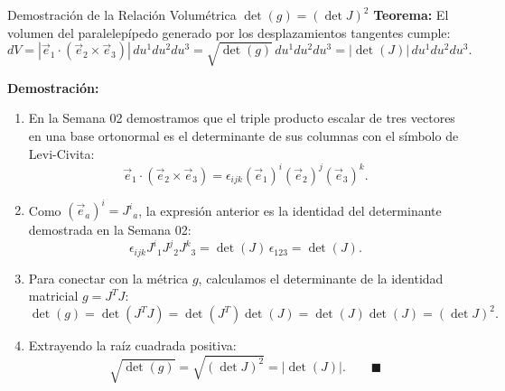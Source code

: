 \documentclass[10pt,aspectratio=169]{beamer}
\begin{document}
\begin{frame}{Demostración de la Relación Volumétrica $\det(g) = (\det J)^2$}
  \footnotesize
  \textbf{Teorema:} El volumen del paralelepípedo generado por los desplazamientos tangentes cumple:
  \[
  dV = |\vec{e}_1 \cdot (\vec{e}_2 \times \vec{e}_3)|\, du^1 du^2 du^3 = \sqrt{\det(g)}\, du^1 du^2 du^3 = |\det(J)|\, du^1 du^2 du^3.
  \]

  \vspace{0.2cm}
  \textbf{Demostración:}
  \begin{enumerate}\itemsep4pt
    \item En la Semana 02 demostramos que el triple producto escalar de tres vectores en una base ortonormal es el determinante de sus columnas con el símbolo de Levi-Civita:
    \[
    \vec{e}_1 \cdot (\vec{e}_2 \times \vec{e}_3) = \epsilon_{ijk} (\vec{e}_1)^i (\vec{e}_2)^j (\vec{e}_3)^k.
    \]
    \item Como $(\vec{e}_a)^i = J^i{}_a$, la expresión anterior es la identidad del determinante demostrada en la Semana 02:
    \[
    \epsilon_{ijk} J^i{}_1 J^j{}_2 J^k{}_3 = \det(J)\,\epsilon_{123} = \det(J).
    \]
    \item Para conectar con la métrica $g$, calculamos el determinante de la identidad matricial $g = J^T J$:
    \[
    \det(g) = \det(J^T J) = \det(J^T)\det(J) = \det(J)\det(J) = (\det J)^2.
    \]
    \item Extrayendo la raíz cuadrada positiva:
    \[
    \sqrt{\det(g)} = \sqrt{(\det J)^2} = |\det(J)|. \qquad \blacksquare
    \]
  \end{enumerate}
\end{frame}
\end{document}
